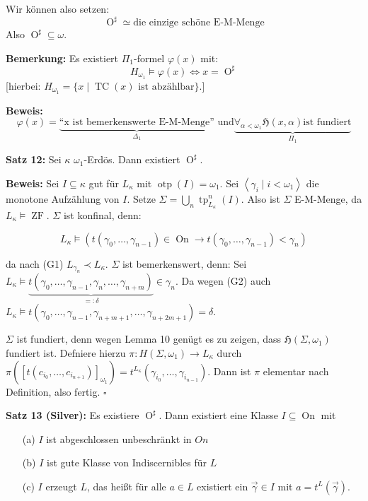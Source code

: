 \documentclass[a4paper,fontsize=11pt]{scrartcl}
\newcommand{\TC}{\operatorname{TC}}
\newcommand{\osharp}{\operatorname{O}^\sharp}
\newcommand{\ZF}{\operatorname{ZF}}
\newcommand{\On}{\operatorname{On}}
\newcommand{\otp}{\operatorname{otp}}
\newcommand{\tp}{\operatorname{tp}}
\begin{document}
Wir können also setzen:
$$ \osharp \simeq \mbox{die einzige schöne E-M-Menge} $$
Also $\osharp\subseteq\omega$.

{\bf Bemerkung:} Es existiert $\Pi_1$-formel $\varphi(x)$ mit:
$$ H_{\omega_1}\models\varphi(x) \Leftrightarrow x=\osharp $$
[hierbei: $H_{\omega_1}=\{x\mid\TC(x)\mbox{ ist abzählbar}\}$.]

{\bf Beweis:} $$ \varphi(x)=\underbrace{\mbox{``x ist bemerkenswerte
    E-M-Menge''}}_{\Delta_1}\mbox{ und
}\underbrace{\forall_{\alpha<\omega_1} \mathfrak{H}(x,\alpha)\mbox{
    ist fundiert}}_{\Pi_1} $$

{\bf Satz 12:} Sei $\kappa$ $\omega_1$-Erdös. Dann existiert
$\osharp$.

{\bf Beweis:} Sei $I\subseteq\kappa$ gut für $L_\kappa$ mit
$\otp(I)=\omega_1$. Sei $\left<\gamma_i\mid i<\omega_1\right>$ die
monotone Aufzählung von $I$. Setze $\Sigma=\bigcup\limits_n
\tp_{L_\kappa}^n(I)$. Also ist $\Sigma$ E-M-Menge, da
$L_\kappa\models\ZF$. $\Sigma$ ist konfinal, denn:

$$ L_\kappa\models(t(\gamma_0,\ldots,\gamma_{n-1})\in\On\rightarrow
t(\gamma_0,\ldots,\gamma_{n-1})<\gamma_n) $$

da nach (G1) $L_{\gamma_n}\prec L_\kappa$. $\Sigma$ ist bemerkenswert,
denn: Sei $L_\kappa\models\underbrace{t(\gamma_0, \ldots,
  \gamma_{n-1}, \gamma_n, \ldots,
  \gamma_{n+m})}_{=:\delta}\in\gamma_n$. Da wegen (G2) auch
$L_\kappa\models t(\gamma_0, \ldots, \gamma_{n-1}, \gamma_{n+m+1},
\ldots, \gamma_{n+2m+1}) = \delta$.

$\Sigma$ ist fundiert, denn wegen Lemma 10 genügt es zu zeigen, dass
$\mathfrak{H}(\Sigma,\omega_1)$ fundiert ist. Defniere hierzu
$\pi:H(\Sigma,\omega_1)\rightarrow L_\kappa$ durch
$\pi([t(c_{i_0},\ldots,c_{i_{n+1}})]_{\omega_1})=t^{L_\kappa}(\gamma_{i_0},\ldots,\gamma_{i_{n-1}})$. Dann
ist $\pi$ elementar nach Definition, also fertig.
\hfill $\square$

{\bf Satz 13 (Silver):} Es existiere $\osharp$. Dann existiert eine
Klasse $I\subseteq\On$ mit
\begin{itemize}
  \item[(a)] $I$ ist abgeschlossen unbeschränkt in $On$
  \item[(b)] $I$ ist gute Klasse von Indiscernibles für $L$
  \item[(c)] $I$ erzeugt $L$, das heißt für alle $a\in L$ existiert
    ein $\vec{\gamma}\in I$ mit $a=t^L(\vec{\gamma})$.
\end{itemize}

\end{document}
